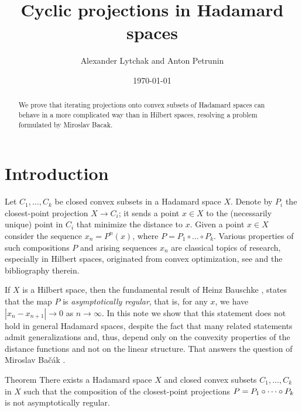 \documentclass[a4paper,10pt]{article}
\def\thetitle{Cyclic projections in Hadamard spaces}
\def\theauthors{Alexander Lytchak and Anton Petrunin}
\begin{document}
\title{\thetitle}	
\author{\theauthors}
\date{\today}
\maketitle

\begin{abstract}
	We  prove that iterating projections onto convex subsets of Hadamard spaces can behave in a more complicated way than in Hilbert spaces, resolving a problem formulated by Miroslav Bacak. 	
\end{abstract}


\section{Introduction}


Let  $C_1,\dots, C_k$ be closed convex subsets in a Hadamard space $X$.
Denote by $P_i$ the closest-point projection $X\to C_i$; it sends a point $x\in X$ to the (necessarily unique) point in $C_i$ that minimize the distance to $x$.
Given a point $x\in X$ consider the sequence $x_n=P^n(x)$, where
$P= P_1\circ \dots \circ P_k$.
Various properties of such compositions  $P$ and arising  sequences $x_n$
are classical topics of research, especially in Hilbert spaces, originated from convex optimization, see \cite{Bac, Bac2, Bauschke, bauschke-borwein-lewis,deutsch-hundal}
and the bibliography therein.

If $X$ is a Hilbert space, then the fundamental result of Heinz Bauschke \cite{Bauschke,Kohlenbach}, states that the map $P$ is \emph{asymptotically regular}, that is, for any $x$, we have  $|x_n-x_{n+1}|\to 0$ as $n\to \infty$.
In this note we show that this statement does not hold in general Hadamard spaces, despite the fact that many related statements
admit generalizations and, thus, depend only on the convexity properties of the distance functions and not on the linear structure. 
That answers the question of Miroslav Bačák \cite[Problem 6.13]{Bac}.

\begin{thm}{Theorem}\label{thm}
There exists a Hadamard space $X$ and closed convex subsets $C_1,\dots,C_k$ in $X$ such that the composition of the closest-point projections $P\z= P_1\circ \dots \circ P_k$ is not asymptotically regular.
\end{thm}
\end{document}
